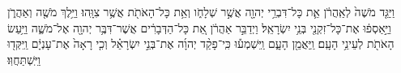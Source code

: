 \documentclass{openreader}
\begin{document}
וַיַּגֵּ֤ד מֹשֶׁה֙ לְאַֽהֲרֹ֔ן אֵ֛ת כָּל־דִּבְרֵ֥י יְהוָ֖ה אֲשֶׁ֣ר שְׁלָחֹ֑ו וְאֵ֥ת כָּל־הָאֹתֹ֖ת אֲשֶׁ֥ר צִוָּֽהוּ׃ 
וַיֵּ֥לֶךְ מֹשֶׁ֖ה וְאַהֲרֹ֑ן וַיַּ֣אַסְפ֔וּ אֶת־כָּל־זִקְנֵ֖י בְּנֵ֥י יִשְׂרָאֵֽל׃ 
וַיְדַבֵּ֣ר אַהֲרֹ֔ן אֵ֚ת כָּל־הַדְּבָרִ֔ים אֲשֶׁר־דִּבֶּ֥ר יְהוָ֖ה אֶל־מֹשֶׁ֑ה וַיַּ֥עַשׂ הָאֹתֹ֖ת לְעֵינֵ֥י הָעָֽם׃ 
וַֽיַּאֲמֵ֖ן הָעָ֑ם וַֽיִּשְׁמְע֡וּ כִּֽי־פָקַ֨ד יְהוָ֜ה אֶת־בְּנֵ֣י יִשְׂרָאֵ֗ל וְכִ֤י רָאָה֙ אֶת־עָנְיָ֔ם וַֽיִּקְּד֖וּ וַיִּֽשְׁתַּחֲוּֽוּ׃ 
\end{document}

